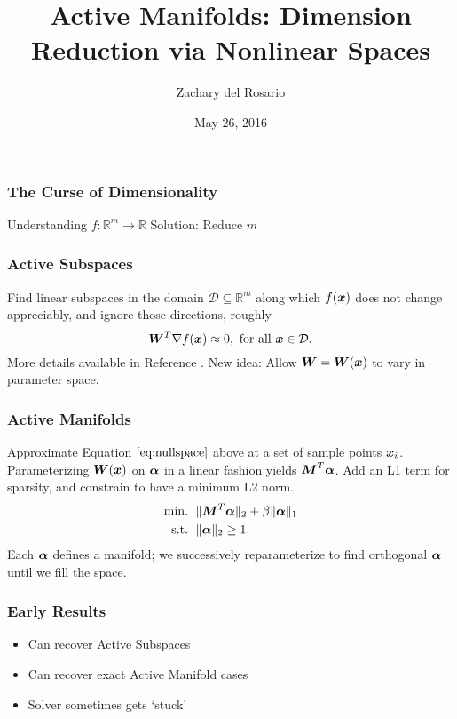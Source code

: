\documentclass{beamer}
\title[Active Manifolds]{Active Manifolds: Dimension Reduction via Nonlinear Spaces} %
\author{Zachary del Rosario} %
\date{May 26, 2016} %
\begin{document}
\begin{frame}
\titlepage %
\end{frame}


\begin{frame}
\frametitle{The Curse of Dimensionality}
\centering
Understanding $f:\mathbb{R}^m\to\mathbb{R}$
Solution: Reduce $m$
\end{frame}


\begin{frame}
\frametitle{Active Subspaces}
Find linear subspaces in the domain $\mathcal{D}\subseteq\mathbb{R}^m$ along which $f(\boldsymbol{x})$ does not change appreciably, and ignore those directions, roughly
\begin{equation}
\boldsymbol{W}^T\nabla f(\boldsymbol{x}) \approx 0, \text{ for all }\boldsymbol{x}\in \mathcal{D}.\label{eq:nullspace}
\end{equation}
More details available in Reference \cite{p1}. New idea: Allow $\boldsymbol{W}=\boldsymbol{W}(\boldsymbol{x})$ to vary in parameter space.
\end{frame}


\begin{frame}
\frametitle{Active Manifolds}
Approximate Equation $\ref{eq:nullspace}$ above at a set of sample points $\boldsymbol{x}_i$. Parameterizing $\boldsymbol{W}(\boldsymbol{x})$ on $\boldsymbol{\alpha}$ in a linear fashion yields $\boldsymbol{M}^T\boldsymbol{\alpha}$. Add an L1 term for sparsity, and constrain to have a minimum L2 norm.
\begin{equation}
\begin{aligned}
\text{min. }&\, \|\boldsymbol{M}^T\boldsymbol{\alpha}\|_2 + \beta\|\boldsymbol{\alpha}\|_1 \\
\text{s.t. }&\, \|\boldsymbol{\alpha}\|_2 \geq 1.
\end{aligned}
\end{equation}
Each $\boldsymbol{\alpha}$ defines a manifold; we successively reparameterize to find orthogonal $\boldsymbol{\alpha}$ until we fill the space.
\end{frame}


\begin{frame}
\frametitle{Early Results}
\begin{itemize}
\item Can recover Active Subspaces
\item Can recover exact Active Manifold cases
\item Solver sometimes gets `stuck'
\end{itemize}
\end{frame}
\end{document}
